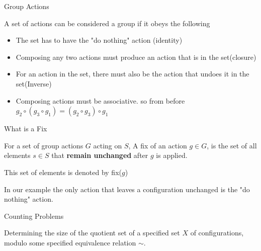 \begin{frame}{Group Actions}
  \begin{sqt:definition}
    A set of actions can be considered a group if it obeys the following\\
    \begin{itemize}
      \item The set has to have the "do nothing" action (identity)\\
      \item Composing any two actions must produce an action that is in the set(closure)\\
      \item For an action in the set, there must also be the action that undoes it in the set(Inverse)\\
      \item Composing actions must be associative. so from before $g_2 \circ (g_3 \circ g_1) = (g_2 \circ g_3) \circ g_1  $\\
    \end{itemize}

  \end{sqt:definition}

\end{frame}


\begin{frame}{What is a Fix}

  \begin{sqt:definition}
    For a set of group actions $G$ acting on $S$, A fix of an action $g \in G$, is
    the set of all elements $s \in S$ that \textbf{remain unchanged} after \(g\) is applied.
  \end{sqt:definition}
  This set of elements is denoted by fix($g$)

  In our example the only action that leaves a configuration unchanged is the "do nothing" action.


\end{frame}

\begin{frame}{Counting Problems}
  \begin{sqt:definition}
    Determining the size of the quotient set of a specified set $X$ of configurations,
    modulo some specified equivalence relation $\sim$.
  \end{sqt:definition}
\end{frame}

